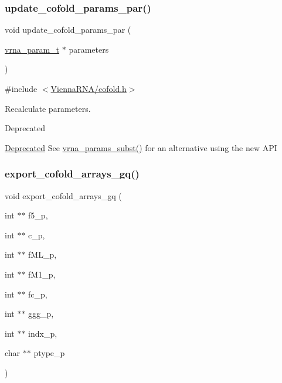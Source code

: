 \subsubsection{\texorpdfstring{update\+\_\+cofold\+\_\+params\+\_\+par()}{update\_cofold\_params\_par()}}
{\footnotesize\ttfamily void update\+\_\+cofold\+\_\+params\+\_\+par (\begin{DoxyParamCaption}\item[{\hyperlink{group__energy__parameters_ga8a69ca7d787e4fd6079914f5343a1f35}{vrna\+\_\+param\+\_\+t} $\ast$}]{parameters }\end{DoxyParamCaption})}



{\ttfamily \#include $<$\hyperlink{cofold_8h}{Vienna\+R\+N\+A/cofold.\+h}$>$}



Recalculate parameters. 

\begin{DoxyRefDesc}{Deprecated}
\item[\hyperlink{deprecated__deprecated000034}{Deprecated}]See \hyperlink{group__energy__parameters_ga5d1909208f7ea3baa98b75afaa1f62ca}{vrna\+\_\+params\+\_\+subst()} for an alternative using the new A\+PI \end{DoxyRefDesc}
\mbox{\label{group__mfe__cofold_ga5f5bf4df35d0554f6ace9579f8744c48}} 
\subsubsection{\texorpdfstring{export\+\_\+cofold\+\_\+arrays\+\_\+gq()}{export\_cofold\_arrays\_gq()}}
{\footnotesize\ttfamily void export\+\_\+cofold\+\_\+arrays\+\_\+gq (\begin{DoxyParamCaption}\item[{int $\ast$$\ast$}]{f5\+\_\+p,  }\item[{int $\ast$$\ast$}]{c\+\_\+p,  }\item[{int $\ast$$\ast$}]{f\+M\+L\+\_\+p,  }\item[{int $\ast$$\ast$}]{f\+M1\+\_\+p,  }\item[{int $\ast$$\ast$}]{fc\+\_\+p,  }\item[{int $\ast$$\ast$}]{ggg\+\_\+p,  }\item[{int $\ast$$\ast$}]{indx\+\_\+p,  }\item[{char $\ast$$\ast$}]{ptype\+\_\+p }\end{DoxyParamCaption})}



